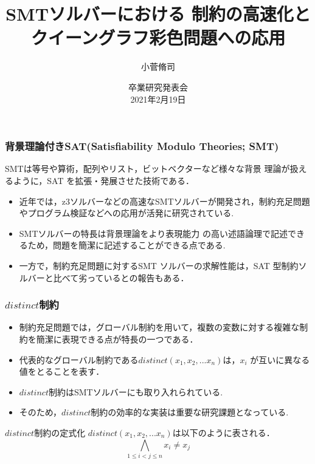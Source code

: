\documentclass [dvipdfmx,11pt]{beamer}
\title[]{SMTソルバーにおける \distinct 制約の高速化とクイーングラフ彩色問題への応用}
\author{小菅脩司}
\institute{番原研究室}
\date{卒業研究発表会\\2021年2月19日}
\newcommand{\distinct}{$distinct$}
\begin{document}
\begin{frame} {}
    \titlepage
\end{frame}



\begin{frame}
    \frametitle{背景理論付きSAT(Satisfiability Modulo Theories; SMT)}
    \begin{alertblock}{}
    SMTは等号や算術，配列やリスト，ビットベクターなど様々な背景 理論が扱えるように，SAT を拡張・発展させた技術である．
    \end{alertblock}
    \begin{itemize}
        \item 近年では，z3ソルバーなどの高速なSMTソルバーが開発され，制約充足問題やプログラム検証などへの応用が活発に研究されている.
        \item SMTソルバーの特長は背景理論をより表現能力 の高い述語論理で記述できるため，問題を簡潔に記述することができる点である.
        \item 一方で，制約充足問題に対するSMT ソルバーの求解性能は，SAT 型制約ソルバーと比べて劣っているとの報告もある．
    \end{itemize}

\end{frame}



\begin{frame}
    \frametitle{\distinct 制約}
    \begin{itemize}
        \item 制約充足問題では，グローバル制約を用いて，複数の変数に対する複雑な制約を簡潔に表現できる点が特長の一つである．
        \item 代表的なグローバル制約である$distinct(x_1,x_2,...x_n)$は，$x_i$ が互いに異なる値をとることを表す．
        \item \distinct 制約はSMTソルバーにも取り入れられている.
        \item そのため，\distinct 制約の効率的な実装は重要な研究課題となっている.
    \end{itemize}
    \begin{block}{\distinct 制約の定式化}
        $distinct(x_1,x_2,...x_n)$は以下のように表される．\\
        $$\bigwedge_{1 \leq i < j \leq n} x_i \neq x_j$$
    \end{block}
\end{frame}
\end{document}
